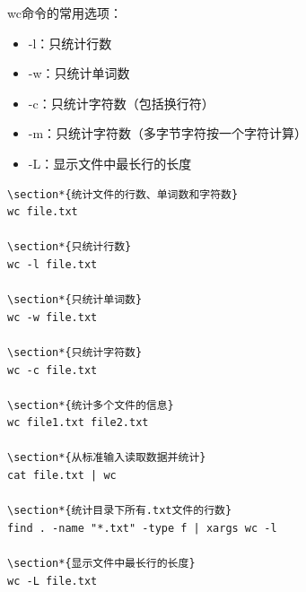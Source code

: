 \documentclass[12pt,UTF8]{ctexbook}
\begin{document}
wc命令的常用选项：
\begin{itemize}
    \item -l：只统计行数
    \item -w：只统计单词数
    \item -c：只统计字符数（包括换行符）
    \item -m：只统计字符数（多字节字符按一个字符计算）
    \item -L：显示文件中最长行的长度
\end{itemize}

\begin{verbatim}
\section*{统计文件的行数、单词数和字符数}
wc file.txt

\section*{只统计行数}
wc -l file.txt

\section*{只统计单词数}
wc -w file.txt

\section*{只统计字符数}
wc -c file.txt

\section*{统计多个文件的信息}
wc file1.txt file2.txt

\section*{从标准输入读取数据并统计}
cat file.txt | wc

\section*{统计目录下所有.txt文件的行数}
find . -name "*.txt" -type f | xargs wc -l

\section*{显示文件中最长行的长度}
wc -L file.txt
\end{verbatim}
\end{document}
